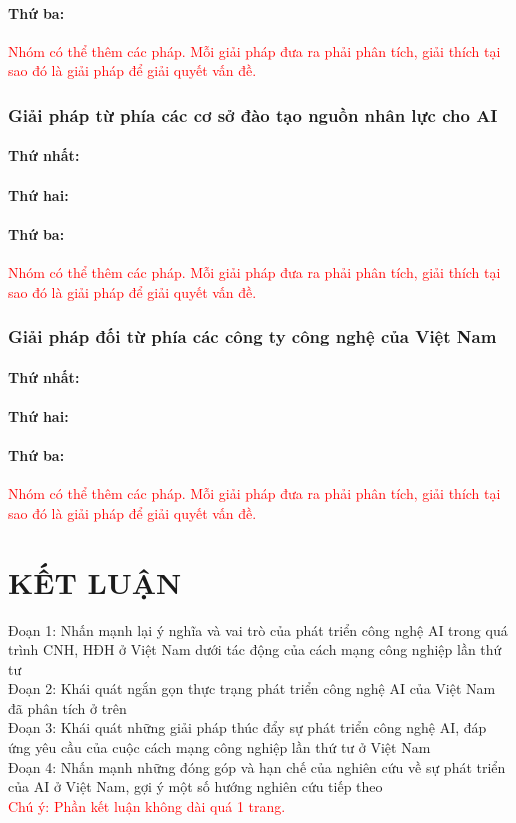 \documentclass{report}
\newcommand{\gachdau}{\hspace*{1.5em}\ignorespaces} %
\begin{document}
\subsubsection{Thứ ba:}
\textcolor{red}{Nhóm có thể thêm các pháp. Mỗi giải pháp đưa ra phải phân tích, giải thích tại sao đó là giải pháp để giải quyết vấn đề.}

\subsection{Giải pháp từ phía các cơ sở đào tạo nguồn nhân lực cho AI}
\subsubsection{Thứ nhất:}
\subsubsection{Thứ hai:}
\subsubsection{Thứ ba:}
\textcolor{red}{Nhóm có thể thêm các pháp. Mỗi giải pháp đưa ra phải phân tích, giải thích tại sao đó là giải pháp để giải quyết vấn đề.}

\subsection{Giải pháp đối từ phía các công ty công nghệ của Việt Nam}
\subsubsection{Thứ nhất:}
\subsubsection{Thứ hai:}
\subsubsection{Thứ ba:}
\textcolor{red}{Nhóm có thể thêm các pháp. Mỗi giải pháp đưa ra phải phân tích, giải thích tại sao đó là giải pháp để giải quyết vấn đề.}

\chapter*{KẾT LUẬN}
\gachdau
Đoạn 1: Nhấn mạnh lại ý nghĩa và vai trò của phát triển công nghệ AI trong quá trình CNH, HĐH ở Việt Nam dưới tác động của cách mạng công nghiệp lần thứ tư\\
\gachdau
Đoạn 2: Khái quát ngắn gọn thực trạng phát triển công nghệ AI của Việt Nam đã phân tích ở trên\\
\gachdau
Đoạn 3: Khái quát những giải pháp thúc đẩy sự phát triển công nghệ AI, đáp ứng yêu cầu của cuộc cách mạng công nghiệp lần thứ tư ở Việt Nam\\
\gachdau
Đoạn 4: Nhấn mạnh những đóng góp và hạn chế của nghiên cứu về sự phát triển của AI ở Việt Nam, gợi ý một số hướng nghiên cứu tiếp theo\\
\gachdau
\textcolor{red}{Chú ý: Phần kết luận không dài quá 1 trang.}
\end{document}
